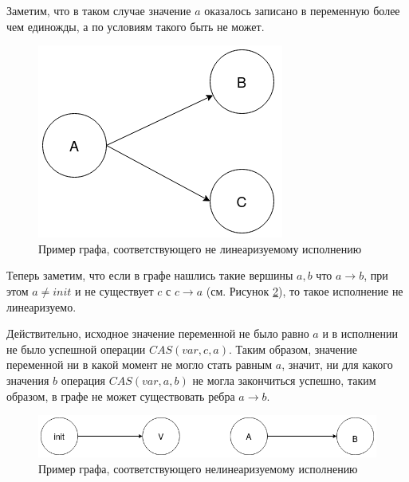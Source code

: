 \documentclass[times,specification,annotation]{itmo-student-thesis}
\begin{document}
\bigbreak

Заметим, что в таком случае значение $a$ оказалось записано в переменную более чем единожды, а по условиям такого быть не может.

\begin{figure}[H]
  \centering
  \caption{Пример графа, соответствующего не линеаризуемому исполнению}
  \label{incorrect-graph-pic}
  \includegraphics[width=\linewidth]{incorrect_graph.png}
\end{figure}

Теперь заметим, что если в графе нашлись такие вершины $a, b$ что $a \rightarrow b$, при этом $a \ne init$ и не существует $c$ с $c \rightarrow a$ (см. Рисунок \ref{incorrect-graph-2-pic}), то такое исполнение не линеаризуемо. 

Действительно, исходное значение переменной не было равно $a$ и в исполнении не было успешной операции $CAS(var, c, a)$. Таким образом, значение переменной ни в какой момент не могло стать равным $a$, значит, ни для какого значения $b$ операция $CAS(var, a, b)$ не могла закончиться успешно, таким образом, в графе не может существовать ребра $a \rightarrow b$.

\begin{figure}[H]
  \centering
  \caption{Пример графа, соответствующего нелинеаризуемому исполнению}
  \label{incorrect-graph-2-pic}
  \includegraphics[width=\linewidth]{incorrect_graph_2.png}
\end{figure}
\end{document}
